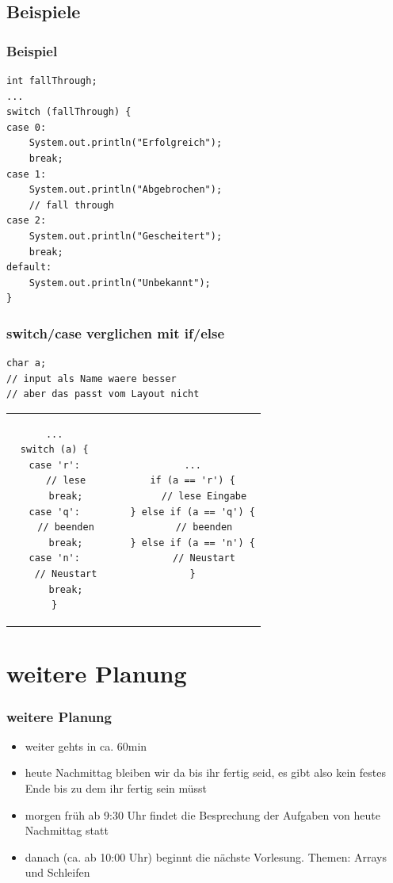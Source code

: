 \documentclass[final]{beamer}
\begin{document}
\subsection{Beispiele}
\begin{frame}[containsverbatim]
	\frametitle{Beispiel}
	\begin{lstlisting}
int fallThrough;
...
switch (fallThrough) {
case 0:
	System.out.println("Erfolgreich");
	break;
case 1:
	System.out.println("Abgebrochen");
	// fall through
case 2:
	System.out.println("Gescheitert");
	break;
default:
	System.out.println("Unbekannt");
}
	\end{lstlisting}
\end{frame}

\begin{frame}[containsverbatim]
\frametitle{switch/case verglichen mit if/else}
	\begin{lstlisting}
char a;
// input als Name waere besser
// aber das passt vom Layout nicht
	\end{lstlisting}
	\begin{tabular}{c c c c}
	\begin{lstlisting}
...
switch (a) {
case 'r':
	// lese
	break;
case 'q':
	// beenden
	break;
case 'n':
	// Neustart
	break;
}
	\end{lstlisting}

& & &

	\begin{lstlisting}
...
if (a == 'r') {
	// lese Eingabe
} else if (a == 'q') {
	// beenden
} else if (a == 'n') {
	// Neustart
}
	\end{lstlisting}\\
	\end{tabular}
\end{frame}

\section{weitere Planung}
\begin{frame}
\frametitle{weitere Planung}
	\begin{itemize}
		\item{weiter gehts in ca. 60min}
		\item{heute Nachmittag bleiben wir da bis ihr fertig seid, es gibt also kein festes Ende bis zu dem ihr fertig sein müsst}
		\item{morgen früh ab 9:30 Uhr findet die Besprechung der Aufgaben von heute Nachmittag statt}
		\item{danach (ca. ab 10:00 Uhr) beginnt die nächste Vorlesung. Themen: Arrays und Schleifen}
	\end{itemize}
\end{frame}
\end{document}
